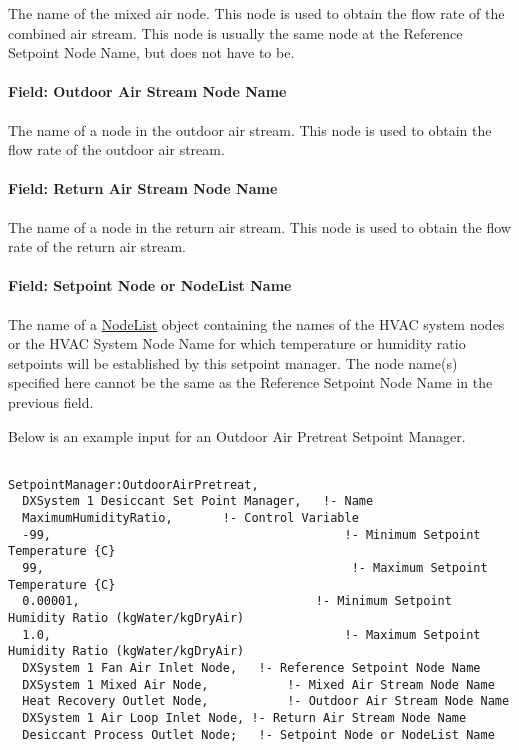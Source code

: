 The name of the mixed air node. This node is used to obtain the flow rate of the combined air stream. This node is usually the same node at the Reference Setpoint Node Name, but does not have to be.

\paragraph{Field: Outdoor Air Stream Node Name}\label{field-outdoor-air-stream-node-name-000}

The name of a node in the outdoor air stream. This node is used to obtain the flow rate of the outdoor air stream.

\paragraph{Field: Return Air Stream Node Name}\label{field-return-air-stream-node-name-000}

The name of a node in the return air stream. This node is used to obtain the flow rate of the return air stream.

\paragraph{Field: Setpoint Node or NodeList Name}\label{field-setpoint-node-or-nodelist-name-9}

The name of a \hyperref[nodelist]{NodeList} object containing the names of the HVAC system nodes or the HVAC System Node Name for which temperature or humidity ratio setpoints will be established by this setpoint manager. The node name(s) specified here cannot be the same as the Reference Setpoint Node Name in the previous field.


Below is an example input for an Outdoor Air Pretreat Setpoint Manager.

\begin{lstlisting}

SetpointManager:OutdoorAirPretreat,
  DXSystem 1 Desiccant Set Point Manager,   !- Name
  MaximumHumidityRatio,       !- Control Variable
  -99,                                         !- Minimum Setpoint Temperature {C}
  99,                                           !- Maximum Setpoint Temperature {C}
  0.00001,                                 !- Minimum Setpoint Humidity Ratio (kgWater/kgDryAir)
  1.0,                                         !- Maximum Setpoint Humidity Ratio (kgWater/kgDryAir)
  DXSystem 1 Fan Air Inlet Node,   !- Reference Setpoint Node Name
  DXSystem 1 Mixed Air Node,           !- Mixed Air Stream Node Name
  Heat Recovery Outlet Node,           !- Outdoor Air Stream Node Name
  DXSystem 1 Air Loop Inlet Node, !- Return Air Stream Node Name
  Desiccant Process Outlet Node;   !- Setpoint Node or NodeList Name
\end{lstlisting}

